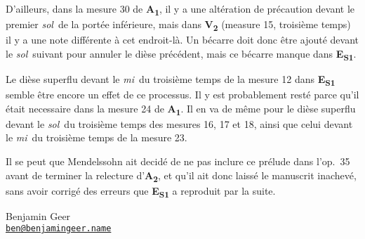 \documentclass[a4paper, 12pt]{book}
\newcommand{\source}[2]{\textbf{#1\textsubscript{#2}}}
\begin{document}
{    D'ailleurs, dans la mesure 30 de \source{A}{1}, il y a une
    altération de précaution devant le premier \textit{sol}\na\ de la
    portée inférieure, mais dans \source{V}{2} (measure 15, troisième
    temps) il y a une note différente à cet endroit-là. Un bécarre
    doit donc être ajouté devant le \textit{sol}\na\ suivant pour
    annuler le dièse précédent, mais ce bécarre manque dans
    \source{E}{S1}.

    Le dièse superflu devant le \textit{mi}\sh\ du troisième temps de
    la mesure 12 dans \source{E}{S1} semble être encore un effet de ce
    processus.  Il y est probablement resté parce qu'il était
    necessaire dans la mesure 24 de \source{A}{1}. Il en va de même
    pour le dièse superflu devant le \textit{sol}\sh\ du troisième
    temps des mesures 16, 17 et 18, ainsi que celui devant le
    \textit{mi}\sh\ du troisième temps de la mesure 23.
    
    Il se peut que Mendelssohn ait decidé de ne pas inclure ce prélude
    dans l'op.\ 35 avant de terminer la relecture d'\source{A}{2}, et
    qu'il ait donc laissé le manuscrit inachevé, sans avoir corrigé
    des erreurs que \source{E}{S1} a reproduit par la suite.
  } {}

\raggedbottom

\vspace{\baselineskip}

\hfill
\begin{minipage}[t]{0.55\textwidth}
  Benjamin Geer \\
  \href{mailto:ben@benjamingeer.name}{\smaller \texttt{ben@benjamingeer.name}}
\end{minipage}

\pagebreak
\cleardoublepage
\mainmatter

\ifdef{\performance}
      {}
      {}
\end{document}
